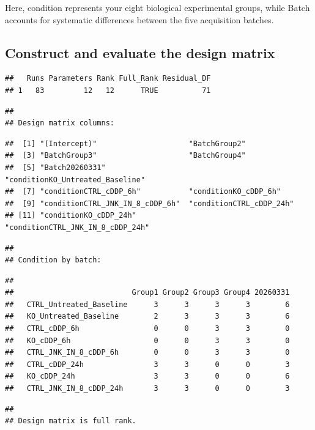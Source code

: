 \documentclass[
  10pt,
]{article}
\begin{document}
Here, condition represents your eight biological experimental groups,
while Batch accounts for systematic differences between the five
acquisition batches.

\subsection{Construct and evaluate the design
matrix}\label{construct-and-evaluate-the-design-matrix}

\begin{verbatim}
##   Runs Parameters Rank Full_Rank Residual_DF
## 1   83         12   12      TRUE          71
\end{verbatim}

\begin{verbatim}
## 
## Design matrix columns:
\end{verbatim}

\begin{verbatim}
##  [1] "(Intercept)"                     "BatchGroup2"                    
##  [3] "BatchGroup3"                     "BatchGroup4"                    
##  [5] "Batch20260331"                   "conditionKO_Untreated_Baseline" 
##  [7] "conditionCTRL_cDDP_6h"           "conditionKO_cDDP_6h"            
##  [9] "conditionCTRL_JNK_IN_8_cDDP_6h"  "conditionCTRL_cDDP_24h"         
## [11] "conditionKO_cDDP_24h"            "conditionCTRL_JNK_IN_8_cDDP_24h"
\end{verbatim}

\begin{verbatim}
## 
## Condition by batch:
\end{verbatim}

\begin{verbatim}
##                          
##                           Group1 Group2 Group3 Group4 20260331
##   CTRL_Untreated_Baseline      3      3      3      3        6
##   KO_Untreated_Baseline        2      3      3      3        6
##   CTRL_cDDP_6h                 0      0      3      3        0
##   KO_cDDP_6h                   0      0      3      3        0
##   CTRL_JNK_IN_8_cDDP_6h        0      0      3      3        0
##   CTRL_cDDP_24h                3      3      0      0        3
##   KO_cDDP_24h                  3      3      0      0        6
##   CTRL_JNK_IN_8_cDDP_24h       3      3      0      0        3
\end{verbatim}

\begin{verbatim}
## 
## Design matrix is full rank.
\end{verbatim}
\end{document}
